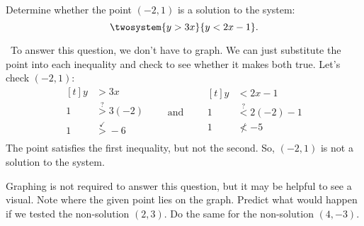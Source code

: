 \begin{boxex}

Determine whether the point $(-2, 1)$ is a solution to the system: \[\twosystem{y > 3x}{y < 2x-1}.\]

\exsoln\ To answer this question, we don't have to graph. We can just substitute the point into each inequality and check to see whether it makes both true. Let's check $(-2,1)$:
\[
\begin{aligned}[t]
y		&>3x\\
1		&\overset{?}{>}3(-2)\\
1 		&\overset{\checkmark}{>} -6\\
\end{aligned}
\qquad\text{and}\qquad
\begin{aligned}[t]
y 	&< 2x-1\\
1	&\overset{?}{<} 2(-2)-1\\
1	&{\nless} -5\\
\end{aligned}
\]
The point satisfies the first inequality, but not the second. So, $(-2,1)$ is not a solution to the system.

Graphing is not required to answer this question, but it may be helpful to see a visual. Note where the given point lies on the graph. Predict what would happen if we tested the non-solution $(2,3)$. Do the same for the non-solution $(4,-3)$.
\begin{center}
\end{center}
\end{boxex}

